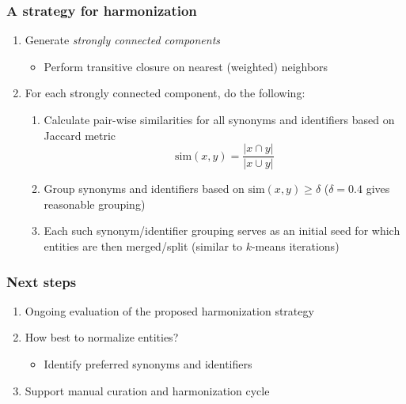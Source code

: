﻿\documentclass[anchorcolor=blue,linkcolor=blue]{beamer}
\begin{document}
\begin{frame}
  \frametitle{A strategy for harmonization}
  \begin{enumerate}
  \item Generate \emph{strongly connected components}
    \begin{itemize}
    \item Perform transitive closure on nearest (weighted) neighbors
    \end{itemize}
  \item For each strongly connected component, do the following:
    \begin{enumerate}
    \item Calculate pair-wise similarities for all synonyms and
      identifiers based on Jaccard metric \[\text{sim}(x,y) =
      \frac{|x\cap y|}{|x\cup y|}\]
    \item Group synonyms and identifiers based on $\text{sim}(x,y) \ge
      \delta$ ($\delta=0.4$ gives reasonable grouping)
    \item Each such synonym/identifier grouping serves as an initial
      seed for which entities are then merged/split (similar to
      $k$-means iterations)
    \end{enumerate}
  \end{enumerate}
\end{frame}

\begin{frame}
  \frametitle{Next steps}
  \begin{enumerate}
  \item Ongoing evaluation of the proposed harmonization strategy
  \item How best to normalize entities?
    \begin{itemize}
    \item Identify preferred synonyms and identifiers
    \end{itemize}
  \item Support manual curation and harmonization cycle
  \end{enumerate}
\end{frame}
\end{document}
